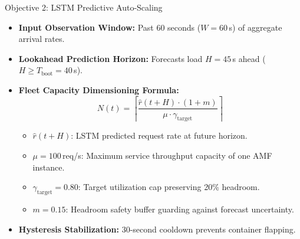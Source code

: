 \documentclass[aspectratio=169,11pt]{beamer}
\begin{document}
\begin{frame}{Objective 2: LSTM Predictive Auto-Scaling}
  \begin{itemize}
    \setlength\itemsep{1.2em}
    \item \textbf{Input Observation Window:} Past 60 seconds ($W = 60$\,s) of aggregate arrival rates.
    \item \textbf{Lookahead Prediction Horizon:} Forecasts load $H = 45$\,s ahead ($H \ge T_{\text{boot}} = 40$\,s).
    \item \textbf{Fleet Capacity Dimensioning Formula:}
      \[ N(t) = \left\lceil \frac{\hat{r}(t+H) \cdot (1 + m)}{\mu \cdot \gamma_{\text{target}}} \right\rceil \]
      \begin{itemize}
        \item $\hat{r}(t+H)$: LSTM predicted request rate at future horizon.
        \item $\mu = 100$\,req/s: Maximum service throughput capacity of one AMF instance.
        \item $\gamma_{\text{target}} = 0.80$: Target utilization cap preserving 20\% headroom.
        \item $m = 0.15$: Headroom safety buffer guarding against forecast uncertainty.
      \end{itemize}
    \item \textbf{Hysteresis Stabilization:} 30-second cooldown prevents container flapping.
  \end{itemize}
\end{frame}
\end{document}
